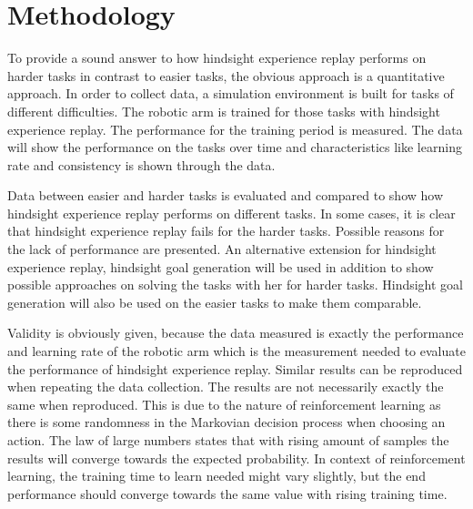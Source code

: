 \chapter{Methodology}

To provide a sound answer to how hindsight experience replay performs on harder tasks in contrast to easier tasks, the obvious approach is a quantitative approach. 
In order to collect data, a simulation environment is built for tasks of different difficulties. The robotic arm is trained for those tasks with hindsight experience replay. The performance for the training period is measured. The data will show the performance on the tasks over time and characteristics like learning rate and consistency is shown through the data.

\vspace{0.5cm} 
Data between easier and harder tasks is evaluated and compared to show how hindsight experience replay performs on different tasks. 
In some cases, it is clear that hindsight experience replay fails for the harder tasks. Possible reasons for the lack of performance are presented. An alternative extension for hindsight experience replay, hindsight goal generation will be used in addition to show possible approaches on solving the tasks with her for harder tasks. Hindsight goal generation will also be used on the easier tasks to make them comparable.

\vspace{0.5cm}

Validity is obviously given, because the data measured is exactly the performance and learning rate of the robotic arm which is the measurement needed to evaluate the performance of hindsight experience replay.
Similar results can be reproduced when repeating the data collection. The results are not necessarily exactly the same when reproduced. This is due to the nature of reinforcement learning as there is some randomness in the Markovian decision process when choosing an action. The law of large numbers %
states that with rising amount of samples the results will converge towards the expected probability. In context of reinforcement learning, the training time to learn needed might vary slightly, but the end performance should converge towards the same value with rising training time.

   